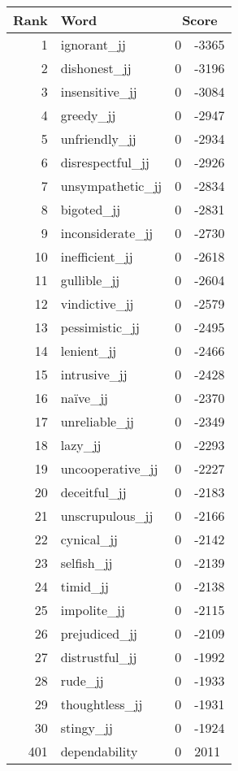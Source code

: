 \begin{longtable}[!htbp]{| rlr@{.}l |}
    \hline
    \textbf{Rank} & \textbf{Word} & \multicolumn{2}{c|}{\textbf{Score}} \\
    \hline
    \endhead
    1 & ignorant\_jj & 0 & -3365 \\
    2 & dishonest\_jj & 0 & -3196 \\
    3 & insensitive\_jj & 0 & -3084 \\
    4 & greedy\_jj & 0 & -2947 \\
    5 & unfriendly\_jj & 0 & -2934 \\
    6 & disrespectful\_jj & 0 & -2926 \\
    7 & unsympathetic\_jj & 0 & -2834 \\
    8 & bigoted\_jj & 0 & -2831 \\
    9 & inconsiderate\_jj & 0 & -2730 \\
    10 & inefficient\_jj & 0 & -2618 \\
    11 & gullible\_jj & 0 & -2604 \\
    12 & vindictive\_jj & 0 & -2579 \\
    13 & pessimistic\_jj & 0 & -2495 \\
    14 & lenient\_jj & 0 & -2466 \\
    15 & intrusive\_jj & 0 & -2428 \\
    16 & naïve\_jj & 0 & -2370 \\
    17 & unreliable\_jj & 0 & -2349 \\
    18 & lazy\_jj & 0 & -2293 \\
    19 & uncooperative\_jj & 0 & -2227 \\
    20 & deceitful\_jj & 0 & -2183 \\
    21 & unscrupulous\_jj & 0 & -2166 \\
    22 & cynical\_jj & 0 & -2142 \\
    23 & selfish\_jj & 0 & -2139 \\
    24 & timid\_jj & 0 & -2138 \\
    25 & impolite\_jj & 0 & -2115 \\
    26 & prejudiced\_jj & 0 & -2109 \\
    27 & distrustful\_jj & 0 & -1992 \\
    28 & rude\_jj & 0 & -1933 \\
    29 & thoughtless\_jj & 0 & -1931 \\
    30 & stingy\_jj & 0 & -1924 \\
    401 & dependability & 0 & 2011 \\

\end{longtable}
